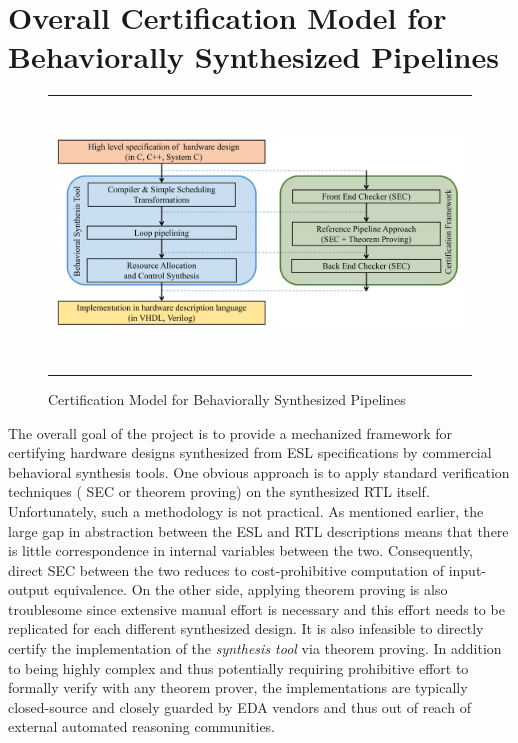 \section{Overall Certification Model for Behaviorally Synthesized Pipelines}

\begin{figure}[t!]
\begin{center}
\begin{tabular}{c}
\includegraphics[height=2.8in]{fig-proposal/certification-framework}
\end{tabular}
\end{center}
\caption{Certification Model for Behaviorally Synthesized Pipelines}
\label{fig:certification-framework}
\end{figure}

The overall goal of the project is to provide a mechanized framework
for certifying hardware designs synthesized from ESL specifications by
commercial behavioral synthesis tools.
One obvious approach is to apply standard verification techniques (%
SEC or
theorem proving) on the synthesized RTL itself.
Unfortunately, such a methodology is not practical.
As mentioned earlier, the large gap in abstraction
between the ESL and RTL descriptions means that there is little
correspondence in internal variables between the two.  Consequently,
direct SEC between the two reduces to cost-prohibitive computation of
input-output equivalence. On the other side, applying theorem proving
is also troublesome since extensive manual effort is necessary and
this effort needs to be replicated for each different synthesized
design. It is also infeasible to
directly certify the implementation of the {\em synthesis tool} via
theorem proving.  In addition to being highly complex and thus
potentially requiring prohibitive effort to formally verify with any
theorem prover, the implementations are typically closed-source and
closely guarded by EDA vendors and thus out of reach of external
automated reasoning communities.

